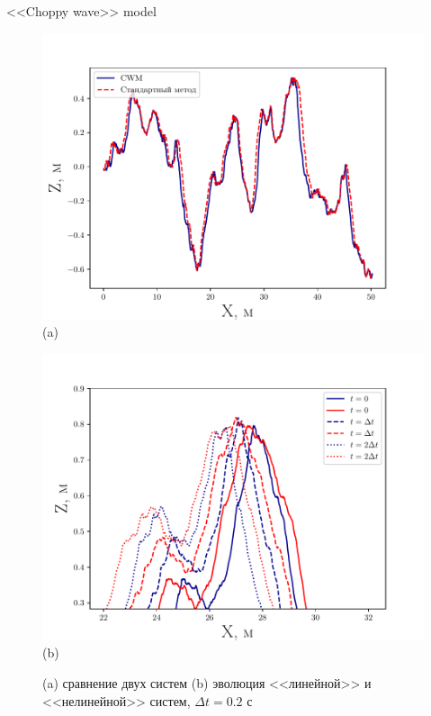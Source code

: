 \begin{frame}[t]{}
\begin{columns}[t]
\begin{column}{.48\linewidth}
\begin{block}{<<Choppy wave>> model}
\begin{figure}[h]
\begin{minipage}{0.45\linewidth}
                        \includegraphics[width=\linewidth]{fig/cwm}
                        \centering 
                        (a)
                    \end{minipage}
                    \begin{minipage}{0.45\linewidth}
                        \includegraphics[width=\linewidth]{fig/evolution}
                        \centering
                        (b)
                    \end{minipage}
                    \caption{(a) сравнение двух систем  (b) эволюция <<линейной>>  и  <<нелинейной>>  систем, $\Delta t = 0.2 \text{ с}$}
                    \label{fig:}
                \end{figure}



\end{block}
\end{column}
\end{columns}
\end{frame}
